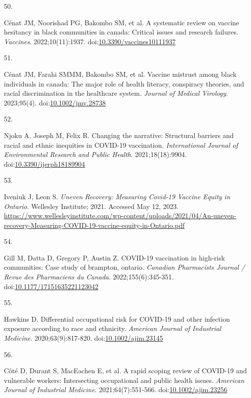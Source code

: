 \documentclass[
  letterpaper,
  DIV=11,
  numbers=noendperiod]{scrartcl}
\newlength{\cslhangindent}
\newlength{\csllabelwidth}
\newlength{\cslentryspacingunit} %
\newenvironment{CSLReferences}[2] %
 {%
  \setlength{\parindent}{0pt}
  \ifodd #1
  \let\oldpar\par
  \def\par{\hangindent=\cslhangindent\oldpar}
  \fi
  \setlength{\parskip}{#2\cslentryspacingunit}
 }%
 {}
\newcommand{\CSLLeftMargin}[1]{\parbox[t]{\csllabelwidth}{#1}}
\newcommand{\CSLRightInline}[1]{\parbox[t]{\linewidth - \csllabelwidth}{#1}\break}
\begin{document}
\begin{CSLReferences}{0}{0}
\leavevmode{}%
\CSLLeftMargin{50. }%
\CSLRightInline{Cénat JM, Noorishad PG, Bakombo SM, et al. A systematic
review on vaccine hesitancy in black communities in canada: Critical
issues and research failures. \emph{Vaccines}. 2022;10(11):1937.
doi:\href{https://doi.org/10.3390/vaccines10111937}{10.3390/vaccines10111937}}

\leavevmode{}%
\CSLLeftMargin{51. }%
\CSLRightInline{Cénat JM, Farahi SMMM, Bakombo SM, et al. Vaccine
mistrust among black individuals in canada: The major role of health
literacy, conspiracy theories, and racial discrimination in the
healthcare system. \emph{Journal of Medical Virology}. 2023;95(4).
doi:\href{https://doi.org/10.1002/jmv.28738}{10.1002/jmv.28738}}

\leavevmode{}%
\CSLLeftMargin{52. }%
\CSLRightInline{Njoku A, Joseph M, Felix R. Changing the narrative:
Structural barriers and racial and ethnic inequities in {COVID}-19
vaccination. \emph{International Journal of Environmental Research and
Public Health}. 2021;18(18):9904.
doi:\href{https://doi.org/10.3390/ijerph18189904}{10.3390/ijerph18189904}}

\leavevmode{}%
\CSLLeftMargin{53. }%
\CSLRightInline{Iveniuk J, Leon S. \emph{Uneven Recovery: Measuring
Covid-19 Vaccine Equity in Ontario}. Wellesley Institute; 2021. Accessed
May 12, 2023.
\url{https://www.wellesleyinstitute.com/wp-content/uploads/2021/04/An-uneven-recovery-Measuring-COVID-19-vaccine-equity-in-Ontario.pdf}}

\leavevmode{}%
\CSLLeftMargin{54. }%
\CSLRightInline{Gill M, Datta D, Gregory P, Austin Z. {COVID}-19
vaccination in high-risk communities: Case study of brampton, ontario.
\emph{Canadian Pharmacists Journal / Revue des Pharmaciens du Canada}.
2022;155(6):345-351.
doi:\href{https://doi.org/10.1177/17151635221123042}{10.1177/17151635221123042}}

\leavevmode{}%
\CSLLeftMargin{55. }%
\CSLRightInline{Hawkins D. Differential occupational risk for {COVID}-19
and other infection exposure according to race and ethnicity.
\emph{American Journal of Industrial Medicine}. 2020;63(9):817-820.
doi:\href{https://doi.org/10.1002/ajim.23145}{10.1002/ajim.23145}}

\leavevmode{}%
\CSLLeftMargin{56. }%
\CSLRightInline{Côté D, Durant S, MacEachen E, et al. A rapid scoping
review of {COVID}-19 and vulnerable workers: Intersecting occupational
and public health issues. \emph{American Journal of Industrial
Medicine}. 2021;64(7):551-566.
doi:\href{https://doi.org/10.1002/ajim.23256}{10.1002/ajim.23256}}


\end{CSLReferences}
\end{document}
